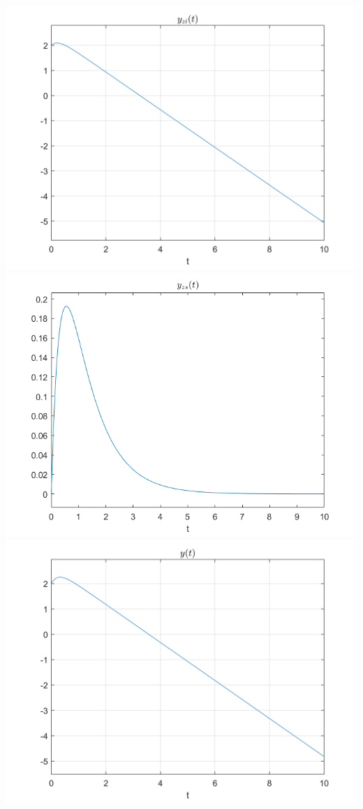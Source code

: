 \documentclass[UTF8,a4paper]{article}
\begin{document}
\includegraphics[]{符号法/3-zi.png}\\
\includegraphics[]{符号法/3-zs.png}\\
\includegraphics[]{符号法/3-all.png}\\
\end{document}
